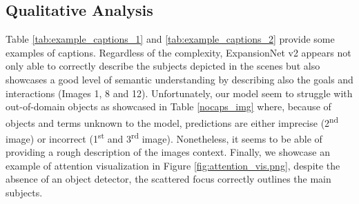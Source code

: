\subsection{Qualitative Analysis}

Table \ref{tab:example_captions_1} and \ref{tab:example_captions_2} provide some examples of captions. Regardless of the complexity, ExpansionNet v2 appears not only able to correctly describe the subjects depicted in the scenes but also showcases a good level of semantic understanding by describing also the goals and interactions (Images 1, 8 and 12). Unfortunately, our model seem to struggle with out-of-domain objects as showcased in Table \ref{nocaps_img} where, because of objects and terms unknown to the model, predictions are either imprecise (2\textsuperscript{nd} image) or incorrect (1\textsuperscript{st} and 3\textsuperscript{rd} image). Nonetheless, it seems to be able of providing a rough description of the images context. Finally, we showcase an example of attention visualization in Figure \ref{fig:attention_vis.png}, despite the absence of an object detector, the scattered focus correctly outlines the main subjects.


